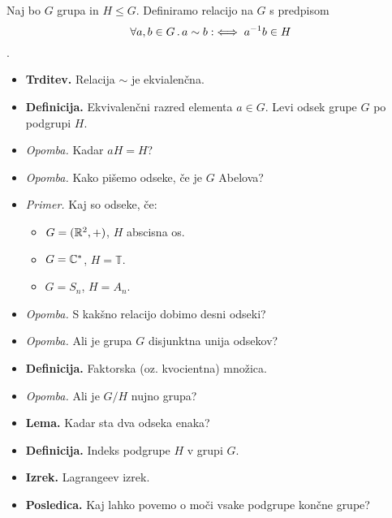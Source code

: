 \begin{enumerate}
    Naj bo $G$ grupa in $H \leq G$. Definiramo relacijo na $G$ s predpisom $$\forall a, b \in G \,.\, a \sim b :\iff a^{-1}b \in H$$.
    \begin{itemize}
        \item \colorbox{blue!30}{\textbf{Trditev.}} Relacija $\sim$ je ekvialenčna.
        \item \colorbox{purple!30}{\textbf{Definicija.}} Ekvivalenčni razred elementa $a \in G$. Levi odsek grupe $G$ po podgrupi $H$.
        \item \colorbox{yellow!30}{\emph{Opomba.}} Kadar $aH = H$?
        \item \colorbox{yellow!30}{\emph{Opomba.}} Kako pišemo odseke, če je $G$ Abelova?
        \item \colorbox{yellow!30}{\emph{Primer.}} Kaj so odseke, če:
        \begin{itemize}
            \item $G = (\mathbb{R}^2, +)$, $H$ abscisna os.
            \item $G = \mathbb{C}^*$, $H = \mathbb{T}$.
            \item $G = S_n$, $H = A_n$.
        \end{itemize}
        \item \colorbox{yellow!30}{\emph{Opomba.}}  S kakšno relacijo dobimo desni odseki?
        \item \colorbox{yellow!30}{\emph{Opomba.}} Ali je grupa $G$ disjunktna unija odsekov?
        \item \colorbox{purple!30}{\textbf{Definicija.}} Faktorska (oz. kvocientna) množica. 
        \item \colorbox{yellow!30}{\emph{Opomba.}} Ali je $G/H$ nujno grupa?
        \item \colorbox{blue!30}{\textbf{Lema.}} Kadar sta dva odseka enaka?
        \item \colorbox{purple!30}{\textbf{Definicija.}} Indeks podgrupe $H$ v grupi $G$.
        \item \colorbox{blue!30}{\textbf{Izrek.}} Lagrangeev izrek.
        \item \colorbox{orange!30}{\textbf{Posledica.}} Kaj lahko povemo o moči vsake podgrupe končne grupe?        
    \end{itemize}


\end{enumerate}
